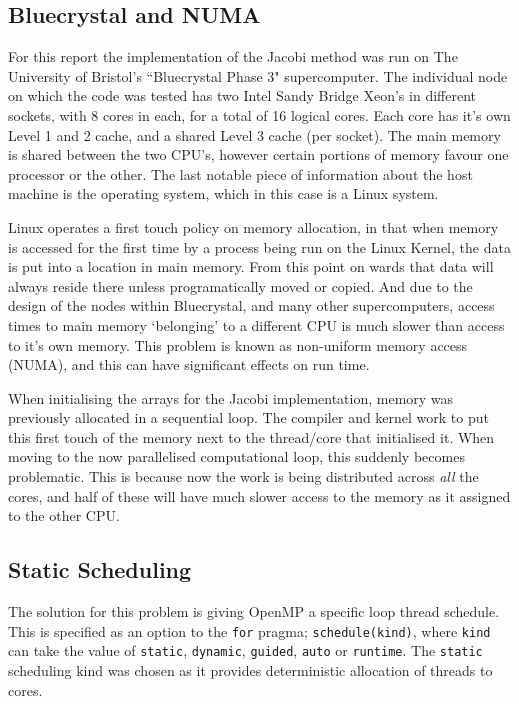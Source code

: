 \documentclass[11pt,twocolumn,a4paper]{article}
\begin{document}
\subsection{Bluecrystal and NUMA}
For this report the implementation of the Jacobi method was run on The University of Bristol's ``Bluecrystal Phase 3" supercomputer. The individual node on which the code was tested has two Intel Sandy Bridge Xeon's in different sockets, with 8 cores in each, for a total of 16 logical cores. Each core has it's own Level 1 and 2 cache, and a shared Level 3 cache (per socket). The main memory is shared between the two CPU's, however certain portions of memory favour one processor or the other. The last notable piece of information about the host machine is the operating system, which in this case is a Linux system. \par

Linux operates a first touch policy on memory allocation, in that when memory is accessed for the first time by a process being run on the Linux Kernel, the data is put into a location in main memory. From this point on wards that data will always reside there unless programatically moved or copied. And due to the design of the nodes within Bluecrystal, and many other supercomputers, access times to main memory `belonging' to a different CPU is much slower than access to it's own memory. This problem is known as non-uniform memory access (NUMA), and this can have significant effects on run time. \par

When initialising the arrays for the Jacobi implementation, memory was previously allocated in a sequential loop. The compiler and kernel work to put this first touch of the memory next to the thread/core that initialised it. When moving to the now parallelised computational loop, this suddenly becomes problematic. This is because now the work is being distributed across \textit{all} the cores, and half of these will have much slower access to the memory as it assigned to the other CPU. \par


\subsection{Static Scheduling}
The solution for this problem is giving OpenMP a specific loop thread schedule. This is specified as an option to the \texttt{for} pragma; \texttt{schedule(kind)}, where \texttt{kind} can take the value of \texttt{static}, \texttt{dynamic}, \texttt{guided}, \texttt{auto} or \texttt{runtime}. The \texttt{static} scheduling kind was chosen as it provides deterministic allocation of threads to cores. \par
\end{document}
